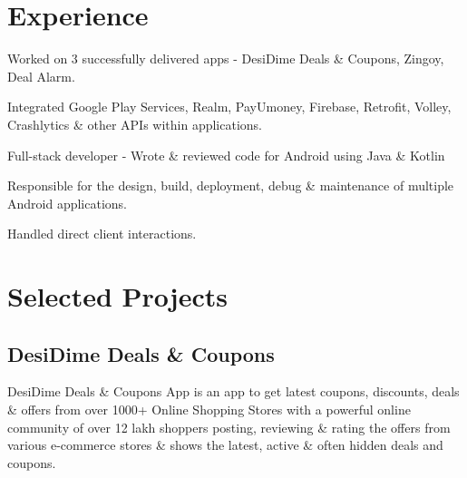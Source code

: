 \documentclass[]{deedy-resume-openfont}
\begin{document}
\hfill
\begin{minipage}[t]{0.66\textwidth} 


 \section{Experience}

\vspace{\topsep} %
\begin{tightemize}
\item Worked on 3 successfully delivered apps - DesiDime Deals \& Coupons, Zingoy, Deal Alarm.
\item Integrated Google Play Services, Realm, PayUmoney, Firebase, Retrofit, Volley, Crashlytics \& other APIs within applications. 
\item Full-stack developer - Wrote \& reviewed code for Android using Java \& Kotlin
\end{tightemize}
\sectionsep

\begin{tightemize}
\item Responsible for the design, build, deployment, debug \& maintenance of multiple Android applications.
\item Handled direct client interactions.
\end{tightemize}
\sectionsep


\section{Selected Projects}
\subsection{DesiDime Deals \& Coupons}
DesiDime Deals \& Coupons App is an app to get latest coupons, discounts, deals \& offers from over 1000+ Online Shopping Stores with a powerful online community of over 12 lakh shoppers posting, reviewing \& rating the offers from various e-commerce stores \& shows the latest, active \& often hidden deals and coupons.


\end{minipage}
\end{document}
